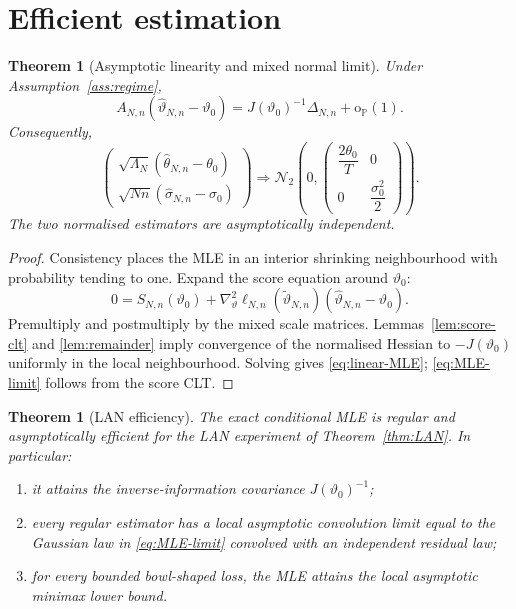 \documentclass[11pt]{article}
\newtheorem{theorem}[assumption]{Theorem}
\theoremstyle{remark}
\newcommand{\Pp}{\mathbb P}
\newcommand{\op}{\mathrm{o}_{\Pp}}
\newcommand{\1}{\mathbf 1}
\newcommand{\elln}{\ell_{N,n}}
\newcommand{\LamN}{\Lambda_N}
\newcommand{\An}{A_{N,n}}
\newcommand{\vzero}{\vartheta_0}
\begin{document}
\section{Efficient estimation}

\begin{theorem}[Asymptotic linearity and mixed normal limit]\label{thm:MLE-CLT}
Under Assumption~\ref{ass:regime},
\begin{equation}\label{eq:linear-MLE}
 \An(\widehat\vartheta_{N,n}-\vzero)
 =J(\vzero)^{-1}\Delta_{N,n}+\op(1).
\end{equation}
Consequently,
\begin{equation}\label{eq:MLE-limit}
 \begin{pmatrix}
 \sqrt{\LamN}(\widehat\theta_{N,n}-\theta_0)\\[1mm]
 \sqrt{Nn}(\widehat\sigma_{N,n}-\sigma_0)
 \end{pmatrix}
 \Rightarrow
 \mathcal N_2\!\left(
 0,
 \begin{pmatrix}
 \dfrac{2\theta_0}{T}&0\\[2mm]
 0&\dfrac{\sigma_0^2}{2}
 \end{pmatrix}
 \right).
\end{equation}
The two normalised estimators are asymptotically independent.
\end{theorem}

\begin{proof}
Consistency places the MLE in an interior shrinking neighbourhood with probability tending to one.  Expand the score equation around $\vzero$:
\[
 0=S_{N,n}(\vzero)
 +\nabla_\vartheta^2\elln(\widetilde\vartheta_{N,n})
 (\widehat\vartheta_{N,n}-\vzero).
\]
Premultiply and postmultiply by the mixed scale matrices.  Lemmas~\ref{lem:score-clt} and \ref{lem:remainder} imply convergence of the normalised Hessian to $-J(\vzero)$ uniformly in the local neighbourhood.  Solving gives \eqref{eq:linear-MLE}; \eqref{eq:MLE-limit} follows from the score CLT.
\end{proof}

\begin{theorem}[LAN efficiency]\label{thm:efficiency}
The exact conditional MLE is regular and asymptotically efficient for the LAN experiment of Theorem~\ref{thm:LAN}.  In particular:
\begin{enumerate}[label=(\roman*)]
 \item it attains the inverse-information covariance $J(\vzero)^{-1}$;
 \item every regular estimator has a local asymptotic convolution limit equal to the Gaussian law in \eqref{eq:MLE-limit} convolved with an independent residual law;
 \item for every bounded bowl-shaped loss, the MLE attains the local asymptotic minimax lower bound.
\end{enumerate}
\end{theorem}
\end{document}
